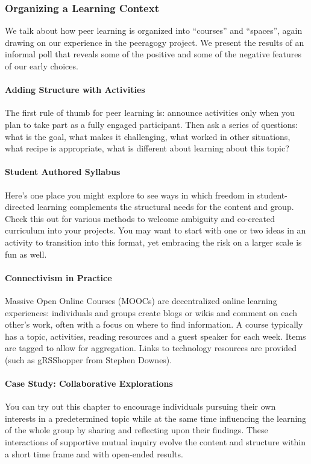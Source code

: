 \subsubsection{Organizing a Learning Context}

\noindent We talk about how peer learning is organized into ``courses'' and
``spaces'', again drawing on our experience in the peeragogy project. We
present the results of an informal poll that reveals some of the
positive and some of the negative features of our early choices.

\paragraph{Adding Structure with Activities} The first rule of thumb for
peer learning is: announce activities only when you plan to take part as
a fully engaged participant. Then ask a series of questions: what is the
goal, what makes it challenging, what worked in other situations, what
recipe is appropriate, what is different about learning about this
topic?

\paragraph{Student Authored Syllabus} Here's one place you might
explore to see ways in which freedom in student-directed learning
complements the structural needs for the content and group. Check this
out for various methods to welcome ambiguity and co-created curriculum
into your projects. You may want to start with one or two ideas in an
activity to transition into this format, yet embracing the risk on a
larger scale is fun as well.

\paragraph{Connectivism in Practice} Massive Open
Online Courses (MOOCs) are decentralized online learning experiences:
individuals and groups create blogs or wikis and comment on each
other's work, often with a focus on where to find information. A
course typically has a topic, activities, reading resources and a
guest speaker for each week. Items are tagged to allow for
aggregation. Links to technology resources are provided (such as
gRSShopper from Stephen Downes).

\paragraph{Case Study: Collaborative Explorations} You can try out this
chapter to encourage individuals pursuing their own interests in a
predetermined topic while at the same time influencing the learning of
the whole group by sharing and reflecting upon their findings. These
interactions of supportive mutual inquiry evolve the content and
structure within a short time frame and with open-ended results.

